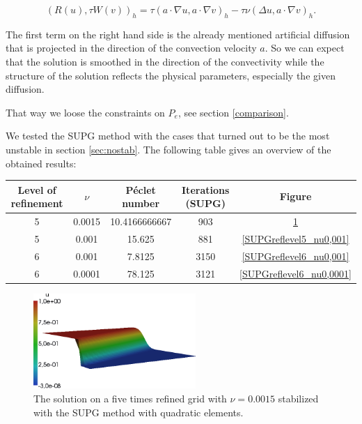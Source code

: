 \documentclass[a4paper, 11pt, twoside]{article}
\begin{document}
	\[\left(R(u), \tau W(v)\right)_{h} = \tau(a \cdot \nabla u, a \cdot \nabla v)_{h} - \tau\nu(\Delta u, a \cdot \nabla v)_{h}.\]
	
The first term on the right hand side is the already mentioned artificial diffusion that is projected in the direction of the convection velocity $a$. So we can expect that the solution is smoothed in the direction of the convectivity while the structure of the solution reflects the physical parameters, especially the given diffusion.

That way we loose the constraints on $P_{e}$, see section \ref{comparison}.

We tested the SUPG method with the cases that turned out to be the most unstable in section \ref{sec:nostab}. The following table gives an overview of the obtained results:

\begin{center}
\begin{tabular}{c|c|c|c|c}
\textbf{Level of refinement} & $\nu$ & \textbf{P\'{e}clet number} & \textbf{Iterations (SUPG)} & \textbf{Figure} \\ \hline\hline
5 & 0.0015 & 10.4166666667	& 903 & \ref{SUPGreflevel5_nu0,0015}\\
5 & 0.001 & 15.625	& 881 & \ref{SUPGreflevel5_nu0,001} \\ \hline
6 & 0.001 & 7.8125	& 3150 & \ref{SUPGreflevel6_nu0,001} \\
6 & 0.0001 & 78.125 & 3121 & \ref{SUPGreflevel6_nu0,0001}
\end{tabular}
\end{center}

\begin{figure}[htbp]
\begin{center}
\includegraphics[width=0.55\textwidth]{fig/SUPG_5_0,0015_quad.png}
\caption{The solution on a five times refined grid with $\nu = 0.0015$ stabilized with the SUPG method with quadratic elements.}
\label{SUPGreflevel5_nu0,0015}
\end{center}
\end{figure}
\end{document}
